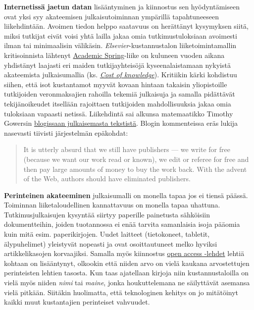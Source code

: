 \textbf{Internetissä jaetun datan} lisääntyminen ja kiinnostus sen
hyödyntämiseen ovat yksi syy akateemisen julkaisutoiminnan ympärillä
tapahtuneeseen liikehdintään. Avoimen tiedon helppo saatavuus on
herättänyt kysymyksen siitä, miksi tutkijat eivät voisi yhtä lailla
jakaa omia tutkimustuloksiaan avoimesti ilman tai minimaalisin
välikäsin. \emph{Elsevier}-kustannustalon liiketoimintamallin
kritisoinnista lähtenyt
\href{http://en.wikipedia.org/wiki/Academic_Spring}{Academic
Spring}-liike on kuluneen vuoden aikana yhdistänyt laajasti eri maiden
tutkijayhteisöjä kyseenalaistamaan nykyistä akateemista julkaisumallia
(ks. \href{http://thecostofknowledge.com/}{\emph{Cost of knowledge}}).
Kritiikin kärki kohdistuu siihen, että isot kustantamot myyvät kovaan
hintaan takaisin yliopistoille tutkijoiden veronmaksajien rahoilla
tekemiä julkaisuja ja samalla pidättävät tekijänoikeudet itsellään
rajoittaen tutkijoiden mahdollisuuksia jakaa omia tuloksiaan vapaasti
netissä. Liikehdintä sai alkunsa matemaatikko Timothy Gowersin
\href{http://gowers.wordpress.com/2012/01/21/elsevier-my-part-in-its-downfall/}{blogissaan
julkaisemasta tekstistä}. Blogin kommenteissa eräs lukija nasevasti
tiivisti järjestelmän epäkohdat:

\begin{quote}
It is utterly absurd that we still have publishers --- we write for free
(because we want our work read or known), we edit or referee for free
and then pay large amounts of money to buy the work back. With the
advent of the Web, authors should have eliminated publishers.
\end{quote}

\textbf{Perinteinen akateeminen} julkaisumalli on monella tapaa jos ei
tiensä päässä. Toiminnan liiketaloudellinen kannattavuus on monella
tapaa uhattuna. Tutkimusjulkaisujen kysyntää siirtyy paperille
painetusta sähköisiin dokumentteihin, joiden tuotannossa ei enää tarvita
samanlaisia isoja pääomia kuin mitä esim. paperikirjojen. Uudet laitteet
(tietokoneet, tabletit, älypuhelimet) yleistyvät nopeasti ja ovat
osoittautuneet melko hyviksi artikkelikasojen korvaajiksi. Samalla myös
kiinnostus \href{http://en.wikipedia.org/wiki/Open-access_journal}{open
access -lehdet} lehtiä kohtaan on lisääntynyt, olkookin että niiden arvo
on vielä kaukana arvostettujen perinteisten lehtien tasosta. Kun taas
ajatellaan kirjoja niin kustannustaloilla on vielä myös niiden
\emph{nimi} tai \emph{maine}, jonka houkuttelemana ne säilyttävät
asemansa vielä pitkään. Siitäkin huolimatta, että teknologinen kehitys
on jo mitätöinyt kaikki muut kustantajien perinteiset vahvuudet.

